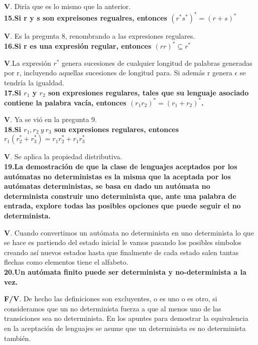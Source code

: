 \documentclass[a4paper,11pt]{article}
\begin{document}
\textbf{V}. Diría que es lo mismo que la anterior. \\

\textbf{15.Si r y s son expreisones regualres, entonces $(r^*s^*)^*=(r+s)^*$}

\textbf{V}. Es la pregunta 8, renombrando a las expresiones regulares. \\

\textbf{16.Si r es una expresión regular, entonces $(rr)^*\subseteq r^*$}

\textbf{V}.La expresión $r^*$ genera sucesiones de cualquier longitud de palabras generadas por r, incluyendo aquellas sucesiones de longitud para. Si además r genera $\epsilon$ se tendría la igualdad. \\

\textbf{17.Si $r_1$ y $r_2$ son expresiones regulares, tales que su lenguaje asociado contiene la palabra vacía, entonces $(r_1r_2)^*=(r_1+r_2)^*$.}

\textbf{V}. Ya se vió en la pregunta 9. \\

\textbf{18.Si $r_1,r_2 \> y \> r_3$ son expresiones regulares, entonces $r_1(r_2^*+r_3^*)=r_1r_2^*+r_1 r_3^*$}

\textbf{V}. Se aplica la propiedad distributiva. \\

\textbf{19.La demostración de que la clase de lenguajes aceptados por los autómatas no deterministas es la misma que la aceptada por los autómatas deterministas, se basa en dado un autómata no determinista construir uno determinista que, ante una palabra de entrada, explore todas las posibles opciones que puede seguir el no determinista.}

\textbf{V}. Cuando convertimos un autómata no determinista en uno determinista lo que se hace es partiendo del estado inicial le vamos pasando los posibles simbolos creando así nuevos estados hasta que finalmente de cada estado salen tantas flechas como elementos tiene el alfabeto. \\

\textbf{20.Un autómata finito puede ser determinista y no-determinista a la vez.}

\textbf{F/V}. De hecho las definiciones son excluyentes, o es uno o es otro, si consideramos que un no determinista fuerza a que al menos uno de las transiciones sea no determinista. En los apuntes para demostrar la equivalencia en la aceptación de lenguajes se asume que un determinista es no determinista también. \\
\end{document}
